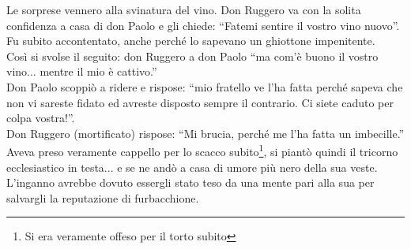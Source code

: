 \documentclass[10pt]{memoir} %
\begin{document}
Le sorprese vennero alla svinatura del vino. Don Ruggero va con la solita confidenza a casa di don Paolo e gli chiede: “Fatemi sentire il vostro vino nuovo”. Fu subito accontentato, anche perché lo sapevano un ghiottone impenitente. \\
Così si svolse il seguito: don Ruggero a don Paolo “ma com’è buono il vostro vino... mentre il mio è cattivo.” \\
Don Paolo scoppiò a ridere e rispose: “mio fratello ve l’ha fatta perché sapeva che non vi sareste fidato ed avreste disposto sempre il contrario. Ci siete caduto per colpa vostra!”.\\
Don Ruggero (mortificato) rispose: “Mi brucia, perché me l’ha fatta un imbecille.”\\
Aveva preso veramente cappello per lo scacco subito\footnote{Si era veramente offeso per il torto subito}, si piantò quindi il tricorno ecclesiastico in testa... e se ne andò a casa di umore più nero della sua veste.\\
L’inganno avrebbe dovuto essergli stato teso da una mente pari alla sua per salvargli la reputazione di furbacchione.\\

\end{document}
